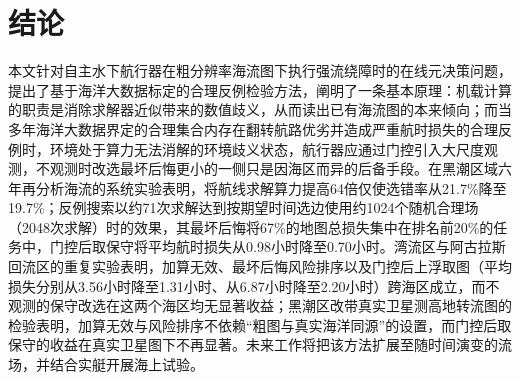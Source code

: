 \section{结论}

本文针对自主水下航行器在粗分辨率海流图下执行强流绕障时的在线元决策问题，提出了基于海洋大数据标定的合理反例检验方法，阐明了一条基本原理：机载计算的职责是消除求解器近似带来的数值歧义，从而读出已有海流图的本来倾向；而当多年海洋大数据界定的合理集合内存在翻转航路优劣并造成严重航时损失的合理反例时，环境处于算力无法消解的环境歧义状态，航行器应通过门控引入大尺度观测，不观测时改选最坏后悔更小的一侧只是因海区而异的后备手段。在黑潮区域六年再分析海流的系统实验表明，将航线求解算力提高64倍仅使选错率从21.7\%降至19.7\%；反例搜索以约71次求解达到按期望时间选边使用约1024个随机合理场（2048次求解）时的效果，其最坏后悔将67\%的地图总损失集中在排名前20\%的任务中，门控后取保守将平均航时损失从0.98小时降至0.70小时。湾流区与阿古拉斯回流区的重复实验表明，加算无效、最坏后悔风险排序以及门控后上浮取图（平均损失分别从3.56小时降至1.31小时、从6.87小时降至2.20小时）跨海区成立，而不观测的保守改选在这两个海区均无显著收益；黑潮区改带真实卫星测高地转流图的检验表明，加算无效与风险排序不依赖“粗图与真实海洋同源”的设置，而门控后取保守的收益在真实卫星图下不再显著。未来工作将把该方法扩展至随时间演变的流场，并结合实艇开展海上试验。
